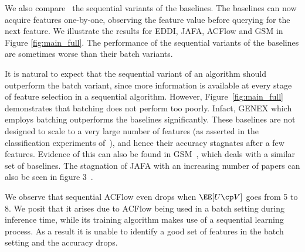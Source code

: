 \documentclass[letterpaper]{article}
\renewcommand{\cite}{\citep}
\begin{document}
We also compare \our\  the sequential variants of the baselines. The baselines can now acquire features one-by-one, observing the feature value before querying for the next feature. We illustrate the results for EDDI, JAFA, ACFlow and GSM in Figure \ref{fig:main_full}. The performance of the sequential variants of the baselines are sometimes worse than their batch variants.

It is natural to expect that the sequential variant of an algorithm should outperform the batch variant, since more information is available at every stage of feature selection in a sequential algorithm. However, Figure~\ref{fig:main_full} demonstrates that batching does not perform too poorly. Infact, GENEX which employs batching outperforms the baselines significantly.
These baselines are not designed to scale to a very large number of features (as asserted in the classification experiments of~\citet{gsm}), and hence their accuracy stagnates after a few features. Evidence of this can also be found in GSM~\citet[Figs. 6,7]{gsm}, which deals with a similar set of baselines. The stagnation of JAFA with an increasing number of papers can also be seen in figure 3~\cite{jafa}.

We observe that sequential ACFlow even drops  when $\EE[U\cp V]$ goes from 5 to 8.  We posit that it arises due to ACFlow being used in a batch setting during inference time, while its training algorithm makes use of a sequential learning process. As a result it is unable to identify a good set of features in the batch setting and the accuracy drops.



\end{document}
